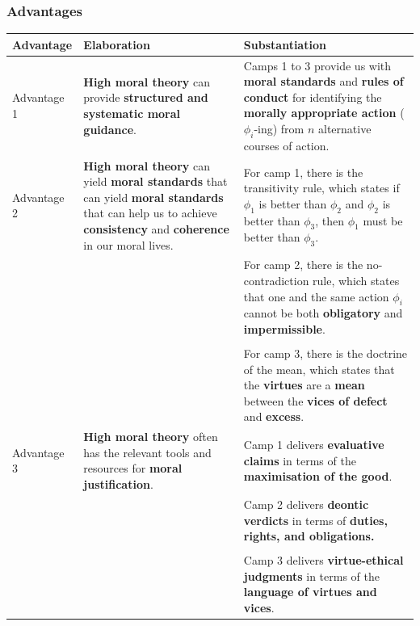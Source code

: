 \documentclass[11pt]{article}
\begin{document}
\subsubsection{Advantages}
\label{sec:orgdb0dfdb}
\begin{center}
\begin{tabular}{|m{5em}|m{10em}|m{20em}|}
\hline
Advantage & Elaboration & Substantiation\\
\hline
Advantage 1 & \textbf{High moral theory} can provide \textbf{structured and systematic moral guidance}. & Camps 1 to 3 provide us with \textbf{moral standards} and \textbf{rules of conduct} for identifying the \textbf{morally appropriate action} (\(\phi_i\)-ing) from \(n\) alternative courses of action.\\
\hline
Advantage 2 & \textbf{High moral theory} can yield \textbf{moral standards} that can yield \textbf{moral standards} that can help us to achieve \textbf{consistency} and \textbf{coherence} in our moral lives. & For camp 1, there is the transitivity rule, which states if \(\phi_1\) is better than \(\phi_2\) and \(\phi_2\) is better than \(\phi_3\), then \(\phi_1\) must be better than \(\phi_3\).\\
 &  & For camp 2, there is the no-contradiction rule, which states that one and the same action \(\phi_i\) cannot be both \textbf{obligatory} and \textbf{impermissible}.\\
 &  & \\
 &  & For camp 3, there is the doctrine of the mean, which states that the \textbf{virtues} are a \textbf{mean} between the \textbf{vices of defect} and \textbf{excess}.\\
\hline
Advantage 3 & \textbf{High moral theory} often has the relevant tools and resources for \textbf{moral justification}. & Camp 1 delivers \textbf{evaluative claims} in terms of the \textbf{maximisation of the good}.\\
 &  & Camp 2 delivers \textbf{deontic verdicts} in terms of \textbf{duties, rights, and obligations.}\\
 &  & \\
 &  & Camp 3 delivers \textbf{virtue-ethical judgments} in terms of the \textbf{language of virtues and vices}.\\
\hline
\end{tabular}
\end{center}
 \newpage
\end{document}
